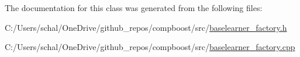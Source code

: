 The documentation for this class was generated from the following files\+:\begin{DoxyCompactItemize}
\item 
C\+:/\+Users/schal/\+One\+Drive/github\+\_\+repos/compboost/src/\mbox{\hyperlink{baselearner__factory_8h}{baselearner\+\_\+factory.\+h}}\item 
C\+:/\+Users/schal/\+One\+Drive/github\+\_\+repos/compboost/src/\mbox{\hyperlink{baselearner__factory_8cpp}{baselearner\+\_\+factory.\+cpp}}\end{DoxyCompactItemize}
